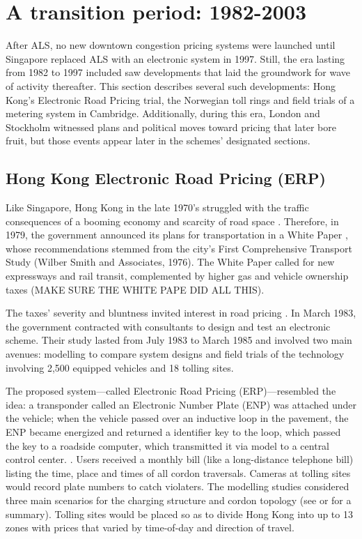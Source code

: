 \section{A transition period: 1982-2003}

After ALS, no new downtown congestion pricing systems were launched until Singapore replaced ALS with an electronic system in 1997. Still, the era lasting from 1982 to 1997 included saw developments that laid the groundwork for wave of activity thereafter. This section describes several such developments: Hong Kong's Electronic Road Pricing trial, the Norwegian toll rings and field trials of a metering system in Cambridge. Additionally, during this era, London and Stockholm witnessed plans and political moves toward pricing that later bore fruit, but those events appear later in the schemes' designated sections.

\subsection{Hong Kong Electronic Road Pricing (ERP)}

Like Singapore, Hong Kong in the late 1970's struggled with the traffic consequences of a booming economy and scarcity of road space \citep{Hau1992}. Therefore, in 1979, the government announced its plans for transportation in a White Paper \citep{EnvironmentalBranch1979}, whose recommendations stemmed from the city's First Comprehensive Transport Study (Wilber Smith and Associates, 1976). The White Paper called for new expressways and rail transit, complemented by higher gas and vehicle ownership taxes (MAKE SURE THE WHITE PAPE DID ALL THIS).

The taxes' severity and bluntness invited interest in road pricing \citep[pp. 22-25]{Gomez-Ibanez1994}. In March 1983, the government contracted with consultants to design and test an electronic scheme. Their study lasted from July 1983 to March 1985 and involved two main avenues: modelling to compare system designs and field trials of the technology involving 2,500 equipped vehicles and 18 tolling sites\citep{Dawson1986}. 

The proposed system---called Electronic Road Pricing (ERP)---resembled the \citet{Vickrey1959} idea: a transponder called an Electronic Number Plate (ENP) was attached under the vehicle; when the vehicle passed over an inductive loop in the pavement, the ENP became energized and returned a identifier key to the loop, which passed the key to a roadside computer, which transmitted it via model to a central control center. \citep[pp. 130-131]{Dawson1986}. Users received a monthly bill (like a long-distance telephone bill) listing the time, place and times of all cordon traversals. Cameras at tolling sites would record plate numbers to catch violaters. The modelling studies considered three main scenarios for the charging structure and cordon topology (see \citet[Table 11, p. 23]{Gomez-Ibanez1994} or \citet[Table 10.3, p. 218]{Small1998} for a summary). Tolling sites would be placed so as to divide Hong Kong into up to 13 zones with prices that varied by time-of-day and direction of travel. 

